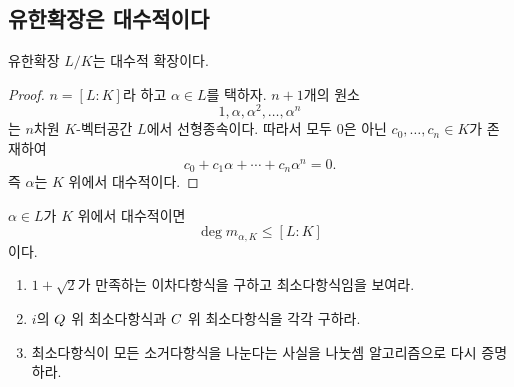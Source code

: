 \subsection{유한확장은 대수적이다}

\begin{theorem}
유한확장 $L/K$는 대수적 확장이다.
\end{theorem}

\begin{proof}
$n=[L:K]$라 하고 $\alpha\in L$를 택하자. $n+1$개의 원소
\[
  1,\alpha,\alpha^2,\dots,\alpha^n
\]
는 $n$차원 $K$-벡터공간 $L$에서 선형종속이다. 따라서 모두 $0$은 아닌 $c_0,\dots,c_n\in K$가 존재하여
\[
  c_0+c_1\alpha+\cdots+c_n\alpha^n=0.
\]
즉 $\alpha$는 $K$ 위에서 대수적이다.
\end{proof}

\begin{corollary}
$\alpha\in L$가 $K$ 위에서 대수적이면
\[
  \deg m_{\alpha,K}\le [L:K]
\]
이다.
\end{corollary}

\begin{checkpoint}
\begin{enumerate}[label=(\alph*)]
  \item $1+\sqrt2$가 만족하는 이차다항식을 구하고 최소다항식임을 보여라.
  \item $i$의 $Q$ 위 최소다항식과 $C$ 위 최소다항식을 각각 구하라.
  \item 최소다항식이 모든 소거다항식을 나눈다는 사실을 나눗셈 알고리즘으로 다시 증명하라.
\end{enumerate}
\end{checkpoint}
